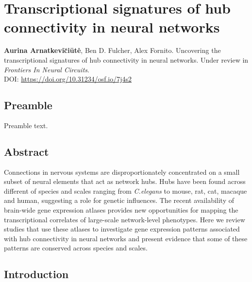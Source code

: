 \chapter{Transcriptional signatures of hub \\connectivity in neural networks}
\label{ch:Chapter3}



\textbf{Aurina Arnatkevi\u{c}i\={u}t\.{e}},
Ben D. Fulcher,
Alex Fornito.
Uncovering the transcriptional signatures of hub connectivity in neural networks. Under review in \textit{
Frontiers In Neural Circuits}.\\
DOI: \url{https://doi.org/10.31234/osf.io/7j4s2} %


\section*{Preamble}
Preamble text.

\newpage

\section*{Abstract}
Connections in nervous systems are disproportionately concentrated on a small subset of neural elements that act as network hubs. Hubs have been found across different of species and scales ranging from \textit{C.elegans} to mouse, rat, cat, macaque and human, suggesting a role for genetic influences. The recent availability of brain-wide gene expression atlases provides new opportunities for mapping the transcriptional correlates of large-scale network-level phenotypes. Here we review studies that use these atlases to investigate gene expression patterns associated with hub connectivity in neural networks and present evidence that some of these patterns are conserved across species and scales.

\section{Introduction}

